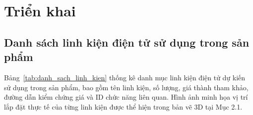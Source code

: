 \section{Triển khai}

\subsection{Danh sách linh kiện điện tử sử dụng trong sản phẩm}

Bảng~\ref{tab:danh_sach_linh_kien} thống kê danh mục linh kiện điện tử dự kiến sử dụng trong sản phẩm, bao gồm tên linh kiện, số lượng, giá thành tham khảo, đường dẫn kiểm chứng giá và ID chức năng liên quan. Hình ảnh minh họa vị trí lắp đặt thực tế của từng linh kiện được thể hiện trong bản vẽ 3D tại Mục 2.1.

\begingroup
\setlength{\tabcolsep}{2.5pt}
